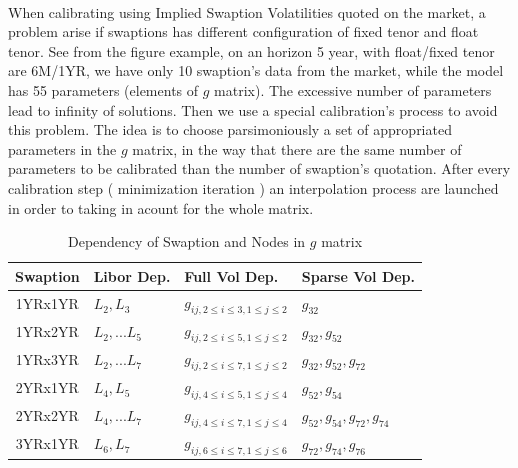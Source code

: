 \documentclass[a4paper,10pt]{article}
\begin{document}
\paragraph{} 
When calibrating using Implied Swaption Volatilities quoted on the market, a problem arise if swaptions has different configuration of fixed tenor and float tenor. See from the figure example, on an horizon 5 year, with float/fixed tenor are 6M/1YR, we have only 10 swaption's data from the market, while the model has 55 parameters (elements of $g$ matrix). The excessive number of parameters lead to infinity of solutions. Then we use a special calibration's process to avoid this problem. The idea is to choose parsimoniously a set of appropriated parameters in the $g$ matrix, in the way that there are the same number of parameters to be calibrated than the number of swaption's quotation. After every calibration step ( minimization iteration ) an interpolation process are launched in order to taking in acount for the whole matrix.
\begin{table}[h]
\begin{center}
\begin{tabular}{||c||l|l|l|}
\hline
Swaption & Libor Dep.   & Full Vol Dep. & Sparse Vol Dep. \\
\hline
1YRx1YR  & $L_2, L_3$   & $g_{ij, 2\leq i\leq 3,1\leq j\leq2}$& $g_{32}$\\
\hline
1YRx2YR  & $L_2,...L_5$ & $g_{ij, 2\leq i\leq 5,1\leq j\leq2}$& $g_{32},g_{52}$ \\
\hline
1YRx3YR  & $L_2,...L_7$ & $g_{ij, 2\leq i\leq 7,1\leq j\leq2}$& $g_{32},g_{52},g_{72}$ \\
\hline
2YRx1YR  & $L_4, L_5$   & $g_{ij, 4\leq i\leq 5,1\leq j\leq4}$& $g_{52},g_{54}$ \\
\hline
2YRx2YR  & $L_4,...L_7$ & $g_{ij, 4\leq i\leq 7,1\leq j\leq4}$& $g_{52},g_{54},g_{72},g_{74}$\\
\hline
3YRx1YR  & $L_6, L_7$   & $g_{ij, 6\leq i\leq 7,1\leq j\leq6}$& $g_{72},g_{74},g_{76}$ \\
\hline
\end{tabular} 
\end{center}
\caption{\label{tab:gNode} Dependency of Swaption and Nodes in $g$ matrix}
\end{table}
\end{document}

